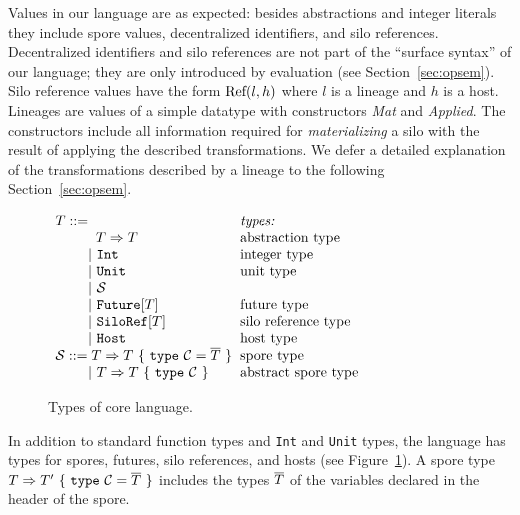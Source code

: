 Values in our language are as expected: besides abstractions and integer literals they
include spore values, decentralized identifiers, and silo
references. Decentralized identifiers and silo references are not part
of the ``surface syntax'' of our language; they are only introduced by
evaluation (see Section~\ref{sec:opsem}). Silo reference values have
the form ${\textrm{Ref}(l, h)}$ where $l$ is a lineage and $h$ is a
host. Lineages are values of a simple datatype with constructors {\em
  Mat} and {\em Applied}. The constructors include all information
required for {\em materializing} a silo with the result of applying
the described transformations. We defer a detailed explanation of the
transformations described by a lineage to the following
Section~\ref{sec:opsem}.

\begin{figure}[h!]
\centering
$\ba[t]{l@{\hspace{2mm}}l}
T ::=                                                                  & \mbox{{\it{types:}}} \\
\gap \:\:\:\: T \Rightarrow T                                          & \mbox{abstraction type} \\
\gap ~|~  \texttt{Int}                                                 & \mbox{integer type} \\
\gap ~|~  \texttt{Unit}                                                & \mbox{unit type} \\
\gap ~|~  \mathcal{S}                                                  & \mbox{} \\
\gap ~|~  \texttt{Future}[T]                                           & \mbox{future type} \\
\gap ~|~  \texttt{SiloRef}[T]                                          & \mbox{silo reference type} \\
\gap ~|~  \texttt{Host}                                                & \mbox{host type} \\
\mathcal{S} ::= T \Rightarrow T~\{~\texttt{type}~\mathcal{C} = \seq{T}~\}   & \mbox{spore type} \\
\gap ~|~ T \Rightarrow T~\{~\texttt{type}~\mathcal{C}~\}               & \mbox{abstract spore type} \\
\ea$
\caption{Types of core language.}\label{fig:types}
\end{figure}

In addition to standard function types and \texttt{Int} and \texttt{Unit} types, the language has types for
spores, futures, silo references, and hosts (see
Figure~\ref{fig:types}). A spore type $T \Rightarrow
T'~\{~\texttt{type}~\mathcal{C} = \overline{T}~\}$ includes the types
$\overline{T}$ of the variables declared in the header of the spore.

